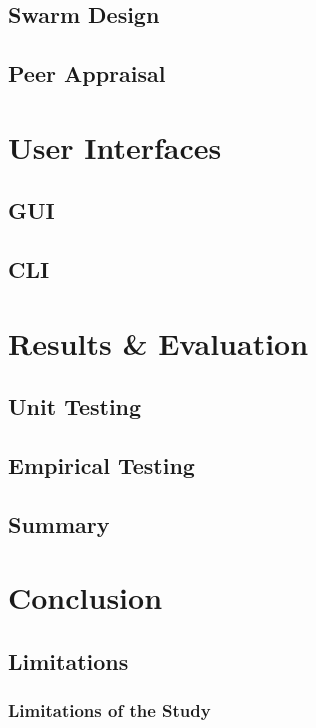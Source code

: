 \documentclass[a4paper, 11pt, twocolumn, twoside]{report}
\begin{document}
\section{Swarm Design}

\section{Peer Appraisal}

\chapter{User Interfaces}

\section{GUI}

\section{CLI}

\chapter{Results \& Evaluation}

\section{Unit Testing}

\section{Empirical Testing}

\section{Summary}

\chapter{Conclusion}

\section{Limitations}

\subsection{Limitations of the Study}
\end{document}
